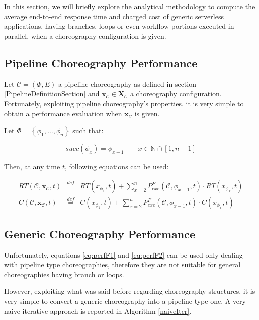 \documentclass[12pt,a4paper]{report}
\newcommand{\mathDef}{\overset{\textit{def}}{=}}
\newcommand{\N}{\mathbb{N}}
\newcommand{\SetFromOneTo}[1]{\N \cap \left[1,#1\right]}
\begin{document}
In this section, we will briefly explore the analytical methodology to compute the average end-to-end response time and charged cost of generic serverless applications, having branches, loops or even workflow portions executed in parallel, when a choreography configuration is given.

\subsection{Pipeline Choreography Performance}

Let $\mathcal{C} = (\Phi,E)$ a pipeline choreography as defined in section \ref{PipelineDefinitionSection} and $\textbf{x}_{\mathcal{C}} \in \textbf{X}_{\mathcal{C}}$ a choreography configuration. Fortunately, exploiting pipeline choreography's properties, it is very simple to obtain a performance evaluation when $\textbf{x}_{\mathcal{C}}$ is given. 

Let $\Phi = \left\{\phi_1, \ldots, \phi_n \right\}$ such that:

\begin{equation}
	succ(\phi_x) = \phi_{x+1}  \qquad x \in \SetFromOneTo{n -1}
\end{equation}


Then, at any time $t$, following equations can be used:

\begin{eqnarray}
	RT(\mathcal{C},\textbf{x}_{\mathcal{C}}, t) & \mathDef &  RT(x_{\phi_1},t) + \sum_{x = 2}^n P_{exe}^F(\mathcal{C},\phi_{x-1},t) \cdot RT(x_{\phi_x},t) \label{eq:perfF1} \\
	C(\mathcal{C},\textbf{x}_{\mathcal{C}}, t) & \mathDef &  C(x_{\phi_1},t) + \sum_{x = 2}^n P_{exe}^F(\mathcal{C},\phi_{x-1},t) \cdot C(x_{\phi_x},t) \label{eq:perfF2}
\end{eqnarray}

\subsection{Generic Choreography Performance}

Unfortunately, equations \ref{eq:perfF1} and \ref{eq:perfF2} can be used only dealing with pipeline type choreographies, therefore they are not suitable for general choreographies having branch or loops. 

However, exploiting what was said before regarding choreography structures, it is very simple to convert a generic choreography into a pipeline type one. A very naive iterative approach is reported in Algorithm \ref{naiveIter}.
\end{document}

